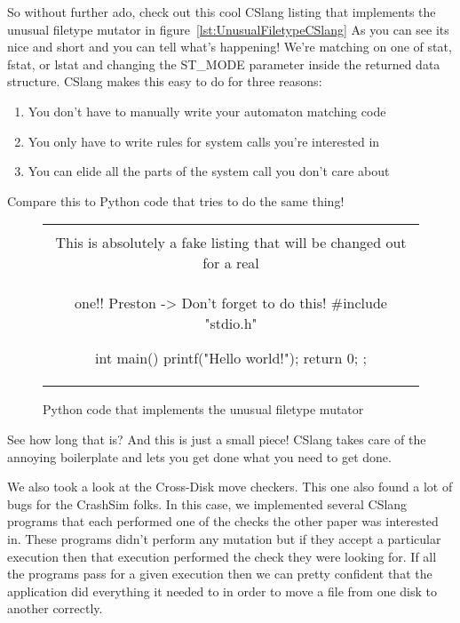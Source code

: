 So without further ado, check out this cool CSlang listing that implements
the unusual filetype mutator in figure~\ref{lst:UnusualFiletypeCSlang}
As you can see its nice and short and you can tell what's happening!
We're matching on one of stat, fstat, or lstat and changing the ST\_MODE
parameter inside the returned data structure.
CSlang makes this easy to do for three reasons:
\begin{enumerate}
  \item{You don't have to manually write your automaton matching code}
  \item{You only have to write rules for system calls you're interested in}
  \item{You can elide all the parts of the system call you don't care
    about}
\end{enumerate}

Compare this to Python code that tries to do the same thing!

\begin{figure}[H]
\centering
\begin{tabular}{c}
\begin{lstlisting}
\\ This is absolutely a fake listing that will be changed out for a real
\\ one!!  Preston -> Don't forget to do this!
#include "stdio.h"

int main() {
    printf("Hello world!\n");
    return 0;
};
\end{lstlisting}
\end{tabular}
\caption{Python code that implements the unusual filetype mutator}
\label{lst:UnusualFiletypePython}
\end{figure}

See how long that is?  And this is just a small piece!  CSlang takes care
of the annoying boilerplate and lets you get done what you need to get
done.

We also took a look at the Cross-Disk move checkers.
This one also found a lot of bugs for the CrashSim folks.
In this case, we implemented several CSlang programs that each performed
one of the checks the other paper was interested in.
These programs didn't perform any mutation but if they accept a particular
execution then that execution performed the check they were looking for.
If all the programs pass for a given execution then we can pretty confident
that the application did everything it needed to in order to move a file
from one disk to another correctly.

